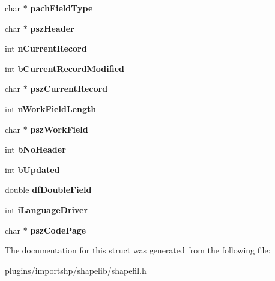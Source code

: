 \begin{DoxyCompactItemize}
\item 
\hypertarget{structDBFInfo_aaa4d4b6baf770b49c5741bf3d2cae397}{char $\ast$ {\bfseries pach\-Field\-Type}}\label{structDBFInfo_aaa4d4b6baf770b49c5741bf3d2cae397}

\item 
\hypertarget{structDBFInfo_aa10d7012c4f08da1eda436b91ad6da62}{char $\ast$ {\bfseries psz\-Header}}\label{structDBFInfo_aa10d7012c4f08da1eda436b91ad6da62}

\item 
\hypertarget{structDBFInfo_affb184ba8efd8fa7623e0f8be3ef2af8}{int {\bfseries n\-Current\-Record}}\label{structDBFInfo_affb184ba8efd8fa7623e0f8be3ef2af8}

\item 
\hypertarget{structDBFInfo_a9a247a27981dbfda16e5f0c51af0aa99}{int {\bfseries b\-Current\-Record\-Modified}}\label{structDBFInfo_a9a247a27981dbfda16e5f0c51af0aa99}

\item 
\hypertarget{structDBFInfo_a933e17b59760a76944301176eda95cf4}{char $\ast$ {\bfseries psz\-Current\-Record}}\label{structDBFInfo_a933e17b59760a76944301176eda95cf4}

\item 
\hypertarget{structDBFInfo_ab42aac59db84db4e0a0bbb701c30c711}{int {\bfseries n\-Work\-Field\-Length}}\label{structDBFInfo_ab42aac59db84db4e0a0bbb701c30c711}

\item 
\hypertarget{structDBFInfo_ac69926b0f1a985763042bf1c5f3f79b2}{char $\ast$ {\bfseries psz\-Work\-Field}}\label{structDBFInfo_ac69926b0f1a985763042bf1c5f3f79b2}

\item 
\hypertarget{structDBFInfo_ab93b0de9c31198e9a5175745cc8e751d}{int {\bfseries b\-No\-Header}}\label{structDBFInfo_ab93b0de9c31198e9a5175745cc8e751d}

\item 
\hypertarget{structDBFInfo_a772b77a9f48d0433b0f137db9457065f}{int {\bfseries b\-Updated}}\label{structDBFInfo_a772b77a9f48d0433b0f137db9457065f}

\item 
\hypertarget{structDBFInfo_ae63975955ad36f99e128c01dff2e11f3}{double {\bfseries df\-Double\-Field}}\label{structDBFInfo_ae63975955ad36f99e128c01dff2e11f3}

\item 
\hypertarget{structDBFInfo_ab9b91bb3d1a4c350aa8a29bf864402df}{int {\bfseries i\-Language\-Driver}}\label{structDBFInfo_ab9b91bb3d1a4c350aa8a29bf864402df}

\item 
\hypertarget{structDBFInfo_a661de784440a3fedc50a13d3e8609410}{char $\ast$ {\bfseries psz\-Code\-Page}}\label{structDBFInfo_a661de784440a3fedc50a13d3e8609410}

\end{DoxyCompactItemize}


The documentation for this struct was generated from the following file\-:\begin{DoxyCompactItemize}
\item 
plugins/importshp/shapelib/shapefil.\-h\end{DoxyCompactItemize}

